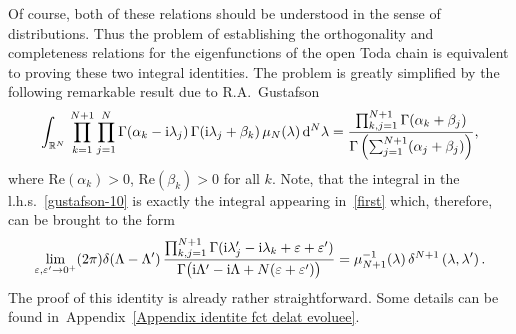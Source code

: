 Of course, both of these relations should be understood in the sense of distributions. Thus the problem of establishing the orthogonality
and completeness relations for the eigenfunctions of the open Toda chain is equivalent to proving these two integral identities. The
problem is greatly simplified by the following remarkable result due to R.A.~Gustafson~\cite[Theorem~5.1]{MR1139492}
%
\begin{align}\label{gustafson-10}
%
\int_{\mathbb R^N}\,
\prod_{k=1}^{N+1}\prod_{j=1}^N \Gamma( \alpha_k-{\rm i}\lambda_j)\,\Gamma({\rm i}\lambda_j+\beta_k)\,
\mu_N(\lambda)\, {\rm d}^N\lambda
=\frac{\prod_{k,j=1}^{N+1}\Gamma(\alpha_k+\beta_j)}
{\Gamma\left(\sum_{j=1}^{N+1}(\alpha_j+\beta_j)\right)},
%
\end{align}
%
where $\text{Re}(\alpha_k)>0$, $\text{Re}(\beta_k)>0$ for all $k$. Note, that the integral in the l.h.s.~\eqref{gustafson-10} is exactly
the integral appearing in~\eqref{first} which, therefore, can be brought to the form
%
\begin{align}\label{first-reduced}
\lim_{\varepsilon,\varepsilon' \rightarrow 0^+} (2\pi) \delta(\Lambda-\Lambda')\,
\frac{\prod_{k,j=1}^{N+1}\Gamma({\rm i}\lambda'_j-{\rm i}\lambda_k+\varepsilon+\varepsilon')}
{\Gamma\big({\rm i}\Lambda'-{\rm i}\Lambda+N(\varepsilon+\varepsilon')\big)} = {\mu_{N+1}^{-1}(\lambda)}\,
\delta^{N+1}\left(\lambda,\lambda'\right).
\end{align}
The proof of this identity is already rather straightforward. Some details can be found in~Appen\-dix~\ref{Appendix identite fct delat
evoluee}.

